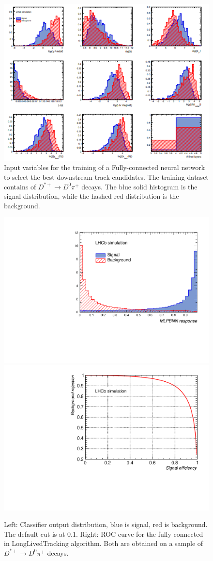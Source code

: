 \begin{figure}[!htbp]
\begin{center}
\includegraphics[width=0.99\linewidth]{figures/NN/input_mva.PNG}
\caption{Input variables for the training of a Fully-connected neural network to select the best downstream track candidates. The training dataset contains of
 $D^{*+} \rightarrow D^{0}\pi^{+}$ decays. The blue solid histogram is the signal
distribution, while the hashed red distribution is the background.}
\label{fig:MVAVars}
\end{center}
\end{figure}

\begin{figure}[!htbp]
\begin{center}
\includegraphics[rotate=270, width=0.45\linewidth]{figures/NN/ClassifierOutputDistribution.pdf}
\includegraphics[rotate=270, width=0.45\linewidth]{figures/NN/ROC.pdf}
\caption{Left: Classifier output distribution, blue is signal, red is
background. The default cut is at 0.1. Right: ROC curve for the fully-connected in LongLivedTracking algorithm. Both are obtained on a sample of
 $D^{*+} \rightarrow D^{0}\pi^{+}$  decays.}
\label{fig:ROC}
\end{center}
\end{figure}

